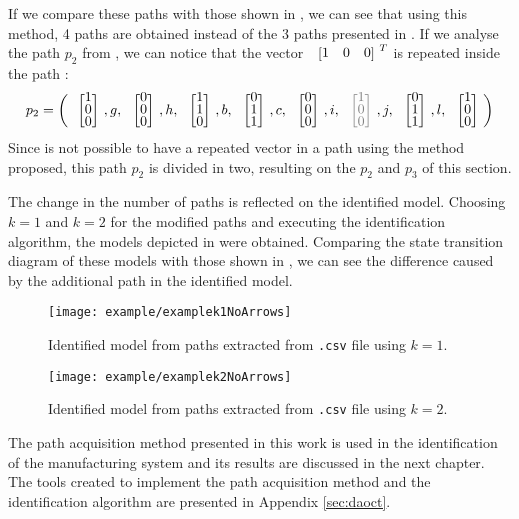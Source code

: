 If we compare these paths with those shown in ,
we can see that using this method, 4 paths are obtained instead of the 3 paths presented in .
If we analyse the path $p_2$ from , we can notice that the vector $\colvec{1&0&0}^ T$ is repeated inside the path :
\begin{align*}
  p_2&= \left(\colvec{1\\0\\0},g,\colvec{0\\0\\0},h,\colvec{1\\1\\0},b,\colvec{0\\1\\1},c,\colvec{0\\0\\0},i,{\color{gray} \colvec{1\\0\\0}},j,\colvec{0\\1\\1},l,\colvec{1\\0\\0}\right) \\
\end{align*}
Since is not possible to have a repeated vector in a path using the method proposed, this path $p_2$ is divided in two, resulting on the $p_2$ and $p_3$ of this section. 

 The change in the number of paths is reflected on the
 identified model. Choosing $k=1$ and $k=2$ for the modified paths and executing the identification algorithm, the models depicted in  were obtained.
Comparing the state transition diagram of these models with those shown in , we can see the difference
caused by the additional path in the identified model.
\begin{figure}[H]
  \centering
  \texttt{[image: example/examplek1NoArrows]}
  \caption{Identified model from paths extracted from \texttt{.csv} file using $k=1$.}
  \label{fig:identExamplekone}
\end{figure}

\begin{figure}[H]
  \centering
  \centering
  \texttt{[image: example/examplek2NoArrows]}
  \caption{Identified model from paths extracted from \texttt{.csv} file using $k=2$.}
  \label{fig:identExamplektwo}
\end{figure}

The path acquisition method presented in this work is used in the identification of the manufacturing system and its results are discussed in the next chapter. 
The tools created to implement the path acquisition method and the
identification algorithm are presented in Appendix \ref{sec:daoct}.


